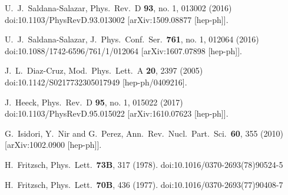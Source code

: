 \documentclass[aps,prd,groupaddress,floatfix,tighten,nofootinbib,showpacs,
amsfonts,superscriptaddress]{revtex4}
\begin{document}
{\begin{thebibliography}{99}
  U.~J.~Saldana-Salazar,
  Phys.\ Rev.\ D {\bf 93}, no. 1, 013002 (2016)
  doi:10.1103/PhysRevD.93.013002
  [arXiv:1509.08877 [hep-ph]].
  
    
  U.~J.~Saldana-Salazar,
  J.\ Phys.\ Conf.\ Ser.\  {\bf 761}, no. 1, 012064 (2016)
  doi:10.1088/1742-6596/761/1/012064
  [arXiv:1607.07898 [hep-ph]].
  
  J.~L.~Diaz-Cruz,
  Mod.\ Phys.\ Lett.\ A {\bf 20}, 2397 (2005)
  doi:10.1142/S0217732305017949
  [hep-ph/0409216].
    
  J.~Heeck,
  Phys.\ Rev.\ D {\bf 95}, no. 1, 015022 (2017)
  doi:10.1103/PhysRevD.95.015022
  [arXiv:1610.07623 [hep-ph]].
  
  
  G.~Isidori, Y.~Nir and G.~Perez,
  Ann.\ Rev.\ Nucl.\ Part.\ Sci.\  {\bf 60}, 355 (2010)
  [arXiv:1002.0900 [hep-ph]].
  
  H.~Fritzsch,
  Phys.\ Lett.\  {\bf 73B}, 317 (1978).
  doi:10.1016/0370-2693(78)90524-5
  
  H.~Fritzsch,
  Phys.\ Lett.\  {\bf 70B}, 436 (1977).
  doi:10.1016/0370-2693(77)90408-7
  

\end{thebibliography}}
\end{document}
